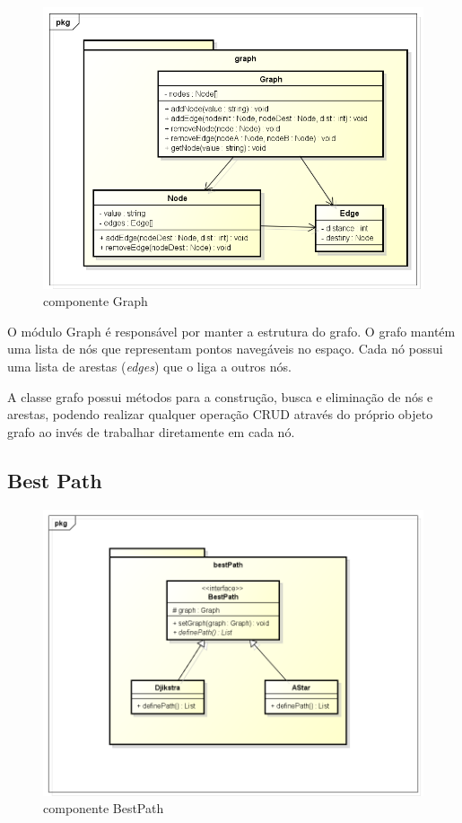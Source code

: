 \begin{figure}[h]
	\centering
	\label{fig29}
		\includegraphics[keepaspectratio=true,scale=0.5]{figuras/pkggraph.png}
	\caption{componente Graph}
\end{figure}

O módulo Graph é responsável por manter a estrutura do grafo. O grafo mantém uma lista de nós que representam pontos navegáveis no espaço. Cada nó possui uma lista de arestas (\textit{edges}) que o liga a outros nós.

A classe grafo possui métodos para a construção, busca e eliminação de nós e arestas, podendo realizar qualquer operação CRUD através do próprio objeto grafo ao invés de trabalhar diretamente em cada nó.

\subsection{Best Path}

\begin{figure}[h]
	\centering
	\label{fig30}
		\includegraphics[keepaspectratio=true,scale=0.5]{figuras/pkgbestPath.png}
	\caption{componente BestPath}
\end{figure}

